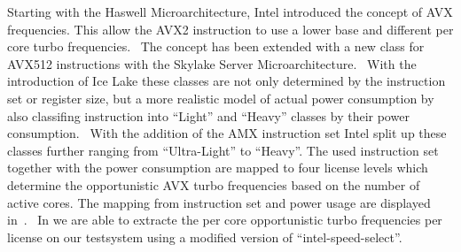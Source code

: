 Starting with the Haswell Microarchitecture, Intel introduced the concept of AVX frequencies.
This allow the AVX2 instruction to use a lower base and different per core turbo frequencies.~\cite{Hackenberg_2015_Haswell}
The concept has been extended with a new class for AVX512 instructions with the Skylake Server Microarchitecture.~\cite[Sec. 2.6.3]{Intel_Optimization_Reference_Manual_050}
With the introduction of Ice Lake these classes are not only determined by the instruction set or register size, but a more realistic model of actual power consumption by also classifing instruction into ``Light'' and ``Heavy'' classes by their power consumption.~\cite{papazian_new_2020}
With the addition of the AMX instruction set Intel split up these classes further ranging from ``Ultra-Light'' to ``Heavy''.
The used instruction set together with the power consumption are mapped to four license levels which determine the opportunistic AVX turbo frequencies based on the number of active cores.
The mapping from instruction set and power usage are displayed in~.~\cite{ServeTheHome_Emerald_Rapids_2023}
In  we are able to extracte the per core opportunistic turbo frequencies per license on our testsystem using a modified version of ``intel-speed-select''.


